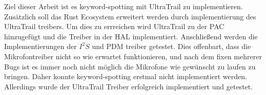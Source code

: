 Ziel dieser Arbeit ist es keyword-spotting mit UltraTrail zu implementieren.
Zusätzlich soll das Rust Ecosystem erweitert werden durch implementierung des UltraTrail treibers.
Um dies zu errreichen wird UltraTrail zu der PAC hinzugefügt und die Treiber in der HAL implementiert.
Anschließend werden die Implementierungen der $I^2S$ und PDM treiber getestet.
Dies offenbart, dass die Mikrofontreiber nicht so wie erwartet funktionieren,
und nach dem fixen mehrerer Bugs ist es immer noch nicht möglich die Mikrofone wie gewünscht
zu laufen zu bringen.
Daher konnte keyword-spotting erstmal nicht implementiert werden.
Allerdings wurde der UltraTrail Treiber erfolgreich implementiert und getestet.
